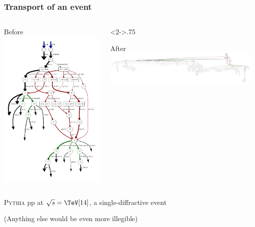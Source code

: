 \documentclass[compress,table,8pt]{beamer}
\newcommand\Pythia{{\scshape Pythia}}
\begin{document}
\begin{frame}
  \frametitle{Transport of an event}
  \begin{columns}[t,onlytextwidth]
    \begin{column}{.2\linewidth}
      \begin{block}{Before}
        \includegraphics[width=\linewidth]{genpythia_event000000.gv.pdf}
      \end{block}
    \end{column}
    \begin{column}<2->{.75\linewidth}
      \begin{block}{After}
        \includegraphics[width=\linewidth]{genpythia_Kine_event000000.gv.pdf}
      \end{block}
    \end{column}
  \end{columns}
  \Pythia{} pp at $\sqrt{s}=\TeV[14]$, a single-diffractive event

  {\footnotesize(Anything else would be even more illegible)}
\end{frame}
\end{document}
